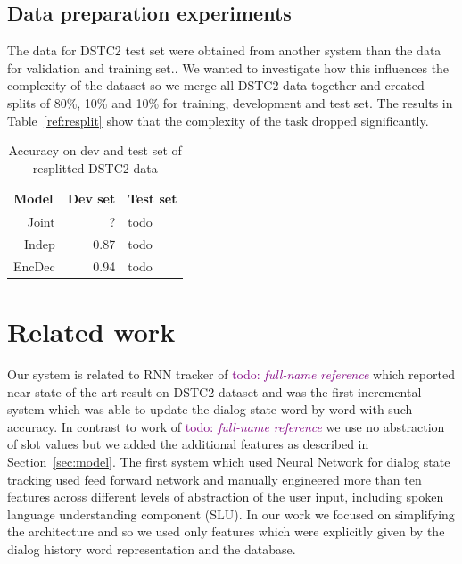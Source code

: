 \documentclass{itatnew}
\def\todo#1{\textcolor{purple}{todo: \textit{#1}}}
\begin{document}
\subsection{Data preparation experiments}
\label{sec:split}
The data for DSTC2 test set were obtained from another system than the data for validation and training set.\cite{henderson2014second}.
We wanted to investigate how this influences the complexity of the dataset so we merge all DSTC2 data together and created splits of 80\%, 10\% and 10\% for training, development and test set.
The results in Table~\ref{ref:resplit} show that the complexity of the task dropped significantly.

\begin{table}
\caption{Accuracy on dev and test set of resplitted DSTC2 data}
\begin{center}
\begin{tabular}{r@{\quad}rll}
\hline
\multicolumn{1}{l}{\rule{0pt}{12pt}
                   Model}&\multicolumn{1}{l}{Dev set}&\multicolumn{2}{l}{Test set}\\[2pt]
\hline\rule{0pt}{12pt}
Joint  &     ?&  todo \\
Indep  &   0.87 & todo \\
EncDec &   0.94 & todo \\
\hline
\end{tabular}
\end{center}
\label{tab:resplit}
\end{table}

\section{Related work}
\label{sec:related}
Our system is related to RNN tracker of \cite{zilka2015incremental}\todo{full-name reference} which reported near state-of-the art result on DSTC2 dataset and was the first incremental system which was able to update the dialog state word-by-word with such accuracy.
In contrast to work of \cite{zilka2015incremental}\todo{full-name reference} we use no abstraction of slot values but we added the additional features as described in Section~\ref{sec:model}.
The first system which used Neural Network for dialog state tracking \cite{henderson2013deep} used feed forward network and manually engineered more than ten features across different levels of abstraction of the user input, including spoken language understanding component (SLU).
In our work we focused on simplifying the architecture and so we used only features which were explicitly given by the dialog history word representation and the database.
\end{document}
